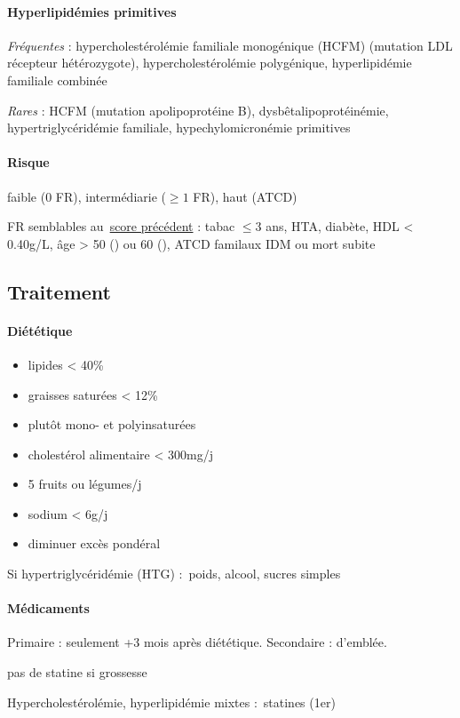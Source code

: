\paragraph{Hyperlipidémies primitives}
\textit{Fréquentes}  : hypercholestérolémie familiale monogénique (HCFM) (mutation LDL récepteur
hétérozygote), hypercholestérolémie polygénique, hyperlipidémie familiale
combinée

\textit{Rares}  : HCFM (mutation apolipoprotéine B),
dysbêtalipoprotéinémie, hypertriglycéridémie familiale, hypechylomicronémie
primitives

\paragraph{Risque} faible (0 FR), intermédiarie ($\ge 1$ FR), haut (ATCD)

FR semblables au~\hyperref[subsec:fr]{score précédent} : tabac $\le 3$ ans, HTA, diabète, HDL < 0.40g/L, âge > 50
(\male) ou 60 (\female), ATCD familaux IDM ou mort subite

\subsection{Traitement}

\paragraph{Diététique}
\begin{itemize}
  \item lipides < 40\%
  \item graisses saturées < 12\%
  \item plutôt mono- et polyinsaturées
  \item cholestérol alimentaire < 300mg/j
  \item 5 fruits ou légumes/j
  \item sodium < 6g/j
  \item diminuer excès pondéral
\end{itemize}
Si hypertriglycéridémie (HTG) : \dec poids, alcool, sucres simples

\paragraph{Médicaments}
Primaire : seulement +3 mois après diététique. Secondaire : d'emblée.

\danger pas de statine si grossesse

Hypercholestérolémie, hyperlipidémie mixtes : statines (1er)

